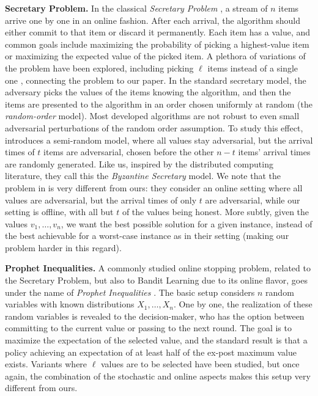 \documentclass[sigconf,nonacm]{aamas}
\begin{document}
\noindent \textbf{Secretary Problem.} In the classical \emph{Secretary Problem} \cite{who_solved_secretary, dynkin}, a stream of $n$ items arrive one by one in an online fashion. After each arrival, the algorithm should either commit to that item or discard it permanently. Each item has a value, and common goals include maximizing the probability of picking a highest-value item or maximizing the expected value of the picked item. A plethora of variations of the problem have been explored, including picking $\ell$ items instead of a single one \cite{k_secretary}, connecting the problem to our paper. In the standard secretary model, the adversary picks the values of the items knowing the algorithm, and then the items are presented to the algorithm in an order chosen uniformly at random (the \emph{random-order} model). Most developed algorithms are not robust to even small adversarial perturbations of the random order assumption. To study this effect, \cite{goran} introduces a semi-random model, where all values stay adversarial, but the arrival times of $t$ items are adversarial, chosen before the other $n - t$ items' arrival times are randomly generated. Like us, inspired by the distributed computing literature, they call this the \emph{Byzantine Secretary} model. We note that the problem in \cite{goran} is very different from ours: they consider an online setting where all values are adversarial, but the arrival times of only $t$ are adversarial, while our setting is offline, with all but $t$ of the values being honest. More subtly, given the values $v_1, \dots, v_n$, we want 
the best possible solution for a given instance, instead of the best achievable for a worst-case instance as in their setting (making our problem harder in this regard).

\noindent \textbf{Prophet Inequalities.} A commonly studied online stopping problem, related to the Secretary Problem, but also to Bandit Learning due to its online flavor, goes under the name of \emph{Prophet Inequalities} \cite{prophet}. The basic setup considers $n$ random variables with known distributions $X_1, \dots, X_n$. One by one, the realization of these random variables is revealed to the decision-maker, who has the option between committing to the current value or passing to the next round. The goal is to maximize the expectation of the selected value, and the standard result is that a policy achieving an expectation of at least half of the ex-post maximum value exists. Variants where $\ell$ values are to be selected have been studied, but once again, the combination of the stochastic and online aspects makes this setup very different from ours.
\end{document}
